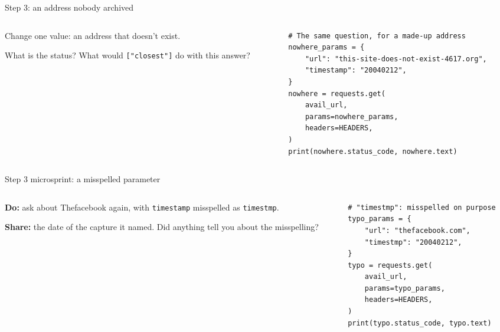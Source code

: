 \documentclass[9pt,aspectratio=169]{beamer}
\begin{document}
\begin{frame}[fragile]{Step 3: an address nobody archived}
    \begin{columns}[T]
        \begin{column}{0.37\textwidth}
            Change one value: an address that doesn't exist.

            \medskip
            What is the status? What would \texttt{["closest"]} do with this answer?
        \end{column}
        \begin{column}{0.6\textwidth}
\begin{lstlisting}
# The same question, for a made-up address
nowhere_params = {
    "url": "this-site-does-not-exist-4617.org",
    "timestamp": "20040212",
}
nowhere = requests.get(
    avail_url,
    params=nowhere_params,
    headers=HEADERS,
)
print(nowhere.status_code, nowhere.text)
\end{lstlisting}
        \end{column}
    \end{columns}
\end{frame}

\begin{frame}[fragile]{Step 3 microsprint: a misspelled parameter}
    \begin{columns}[T]
        \begin{column}{0.37\textwidth}
            \textbf{Do:} ask about Thefacebook again, with \texttt{timestamp} misspelled as \texttt{timestmp}.

            \medskip
            \textbf{Share:} the date of the capture it named. Did anything tell you about the misspelling?
        \end{column}
        \begin{column}{0.6\textwidth}
\begin{lstlisting}
# "timestmp": misspelled on purpose
typo_params = {
    "url": "thefacebook.com",
    "timestmp": "20040212",
}
typo = requests.get(
    avail_url,
    params=typo_params,
    headers=HEADERS,
)
print(typo.status_code, typo.text)
\end{lstlisting}
        \end{column}
    \end{columns}
\end{frame}
\end{document}
